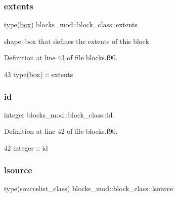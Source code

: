 \subsubsection{\texorpdfstring{extents}{extents}}
{\footnotesize\ttfamily type(\mbox{\hyperlink{structgeometry__mod_1_1box}{box}}) blocks\+\_\+mod\+::block\+\_\+class\+::extents\hspace{0.3cm}{\ttfamily [private]}}



shape\+::box that defines the extents of this block 



Definition at line 43 of file blocks.\+f90.


\begin{DoxyCode}
43         \textcolor{keywordtype}{type}(box) :: extents
\end{DoxyCode}
\mbox{\label{structblocks__mod_1_1block__class_addd1a493d56aa1ffd1bc27c56b682065}} 
\subsubsection{\texorpdfstring{id}{id}}
{\footnotesize\ttfamily integer blocks\+\_\+mod\+::block\+\_\+class\+::id\hspace{0.3cm}{\ttfamily [private]}}



Definition at line 42 of file blocks.\+f90.


\begin{DoxyCode}
42         \textcolor{keywordtype}{integer} :: id
\end{DoxyCode}
\mbox{\label{structblocks__mod_1_1block__class_a2f4d63afb2696e2728f20a99e26a4b18}} 
\subsubsection{\texorpdfstring{lsource}{lsource}}
{\footnotesize\ttfamily type(sourcelist\+\_\+class) blocks\+\_\+mod\+::block\+\_\+class\+::lsource\hspace{0.3cm}{\ttfamily [private]}}



